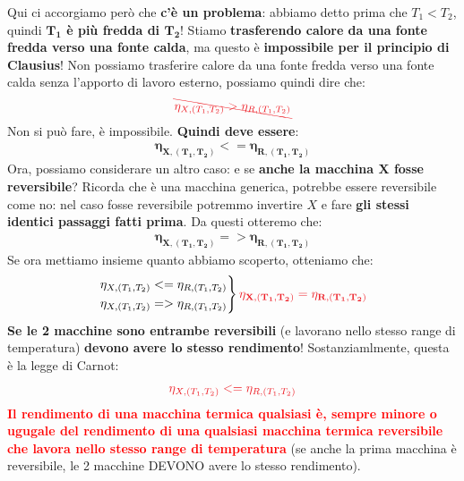             Qui ci accorgiamo però che \textbf{c'è un problema}: abbiamo detto prima che $T_1<T_2$, quindi \textbf{$\mathbf{T_1}$ è più fredda di $\mathbf{T_2}$}! Stiamo \textbf{trasferendo calore da una fonte fredda verso una fonte calda}, ma questo è \textbf{impossibile per il principio di Clausius}! Non possiamo trasferire calore da una fonte fredda verso una fonte calda senza l'apporto di lavoro esterno, possiamo quindi dire che:
            \begin{align*}
                \textcolor{Red}{\bcancel{\eta_{X, (T_1, T_2)} > \eta_{R, (T_1, T_2)}}}
            \end{align*}
            Non si può fare, è impossibile. \textbf{Quindi deve essere}:
            \begin{align*}
                \mathbf{\eta_{X, (T_1, T_2)} <= \eta_{R, (T_1, T_2)}}
            \end{align*}
            Ora, possiamo considerare un altro caso: e se \textbf{anche la macchina $\mathbf{X}$ fosse reversibile}? Ricorda che è una macchina generica, potrebbe essere reversibile come no: nel caso fosse reversibile potremmo invertire $X$ e fare \textbf{gli stessi identici passaggi fatti prima}. Da questi otteremo che:
            \begin{align*}
                \mathbf{\eta_{X, (T_1, T_2)} => \eta_{R, (T_1, T_2)}}
            \end{align*}
            Se ora mettiamo insieme quanto abbiamo scoperto, otteniamo che:
            \begin{align*}
                \begin{rcases*}
                    \eta_{X, (T_1, T_2)} <= \eta_{R, (T_1, T_2)} \\
                    \eta_{X, (T_1, T_2)} => \eta_{R, (T_1, T_2)}
                \end{rcases*}
                \textcolor{Red}{\mathbf{\eta_{X, (T_1, T_2)} = \eta_{R, (T_1, T_2)}}}
            \end{align*}
            \textbf{Se le 2 macchine sono entrambe reversibili} (e lavorano nello stesso range di temperatura) \textbf{devono avere lo stesso rendimento}! Sostanziamlmente, questa è la legge di Carnot:
            \begin{align}
                \textcolor{Red}{\eta_{X, (T_1, T_2)} <= \eta_{R, (T_1, T_2)}}
            \end{align}
            \textcolor{Red}{\textbf{Il rendimento di una macchina termica qualsiasi è, sempre minore o ugugale del rendimento di una qualsiasi macchina termica reversibile che lavora nello stesso range di temperatura}} (se anche la prima macchina è reversibile, le 2 macchine DEVONO avere lo stesso rendimento).

